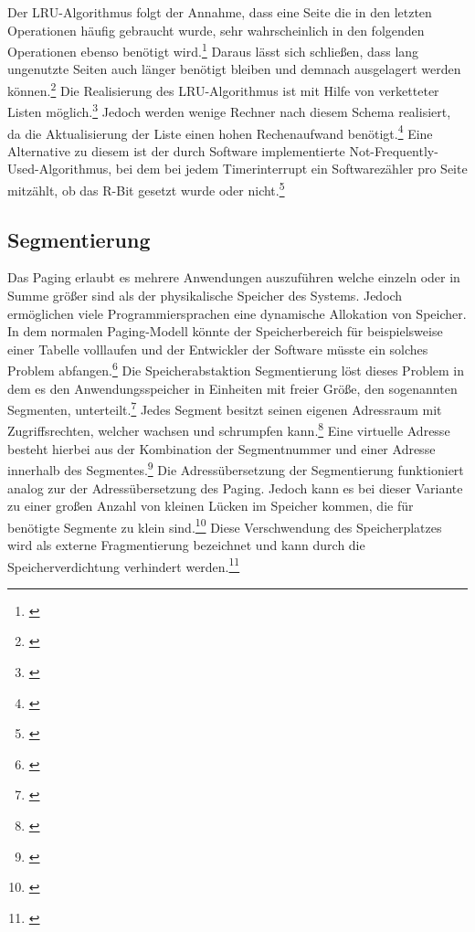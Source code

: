 Der \ac{LRU}-Algorithmus folgt der Annahme, dass eine Seite die in den letzten Operationen häufig gebraucht wurde, sehr wahrscheinlich in den folgenden Operationen ebenso benötigt wird.\footnote{\cite[S.~272]{Tanenbaum.2016}} Daraus lässt sich schließen, dass lang ungenutzte Seiten auch länger benötigt bleiben und demnach ausgelagert werden können.\footnote{\cite[S.~272]{Tanenbaum.2016}} Die Realisierung des \ac{LRU}-Algorithmus ist mit Hilfe von verketteter Listen möglich.\footnote{\cite[S.~272]{Tanenbaum.2016}} Jedoch werden wenige Rechner nach diesem Schema realisiert, da die Aktualisierung der Liste einen hohen Rechenaufwand benötigt.\footnote{\cite[S.~272]{Tanenbaum.2016}} Eine Alternative zu diesem ist der durch Software implementierte Not-Frequently-Used-Algorithmus, bei dem bei jedem Timerinterrupt ein Softwarezähler pro Seite mitzählt, ob das R-Bit gesetzt wurde oder nicht.\footnote{\cite[S.~273]{Tanenbaum.2016}}

\subsection{Segmentierung}
Das Paging erlaubt es mehrere Anwendungen auszuführen welche einzeln oder in Summe  größer sind als der physikalische Speicher des Systems. Jedoch ermöglichen viele Programmiersprachen eine dynamische Allokation von Speicher. In dem normalen Paging-Modell könnte der Speicherbereich für beispielsweise einer Tabelle volllaufen und der Entwickler der Software müsste ein solches Problem abfangen.\footnote{\cite[S.~302]{Tanenbaum.2016}} Die Speicherabstaktion Segmentierung löst dieses Problem in dem es den Anwendungsspeicher in Einheiten mit freier Größe, den sogenannten Segmenten, unterteilt.\footnote{\cite[S.~303]{Tanenbaum.2016}}  Jedes Segment besitzt seinen eigenen Adressraum mit Zugriffsrechten, welcher wachsen und schrumpfen kann.\footnote{\cite[S.~303]{Tanenbaum.2016}} Eine virtuelle Adresse besteht hierbei aus der Kombination der Segmentnummer und einer Adresse innerhalb des Segmentes.\footnote{\cite[S.~304]{Tanenbaum.2016}} Die Adressübersetzung der Segmentierung funktioniert analog zur der Adressübersetzung des Paging. Jedoch kann es bei dieser Variante zu einer großen Anzahl von kleinen Lücken im Speicher kommen, die für benötigte Segmente zu klein sind.\footnote{\cite[S.~306]{Tanenbaum.2016}} Diese Verschwendung des Speicherplatzes wird als externe Fragmentierung bezeichnet und kann durch die Speicherverdichtung verhindert werden.\footnote{\cite[S.~306]{Tanenbaum.2016}}

